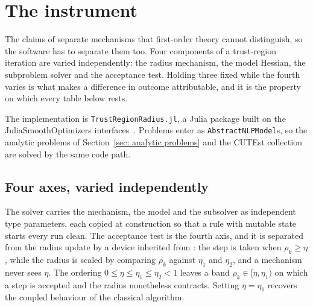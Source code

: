 \documentclass[11pt]{article}
\theoremstyle{plain}
\theoremstyle{definition}
\theoremstyle{remark}
\numberwithin{equation}{section}
\begin{document}
\section{The instrument}
\label{sec: instrument}
\label{sec: setup}

The claims of \PartII{} separate mechanisms that first-order theory cannot
distinguish, so the software has to separate them too. Four components of a
trust-region iteration are varied independently: the radius mechanism, the model
Hessian, the subproblem solver and the acceptance test. Holding three fixed while
the fourth varies is what makes a difference in outcome attributable, and it is
the property on which every table below rests.

The implementation is \texttt{TrustRegionRadius.jl}, a Julia package built on the
JuliaSmoothOptimizers interfaces~\citep{JSO, Julia17}. Problems enter as
\texttt{AbstractNLPModel}s, so the analytic problems of
Section~\ref{sec: analytic problems} and the CUTEst collection~\citep{GouldOrbanToint15}
are solved by the same code path.

\subsection{Four axes, varied independently}
\label{sec: four axes}

The solver carries the mechanism, the model and the subsolver as independent type
parameters, each copied at construction so that a rule with mutable state starts
every run clean. The acceptance test is the fourth axis, and it is separated from
the radius update by a device inherited from \PartI: the step is taken when
$\rho_k \geq \eta$, while the radius is scaled by comparing $\rho_k$ against
$\eta_1$ and $\eta_2$, and a mechanism never sees $\eta$. The ordering
$0 \leq \eta \leq \eta_1 \leq \eta_2 < 1$ leaves a band $\rho_k \in [\eta,\eta_1)$
on which a step is accepted and the radius nonetheless contracts. Setting
$\eta = \eta_1$ recovers the coupled behaviour of the classical algorithm.
\end{document}
